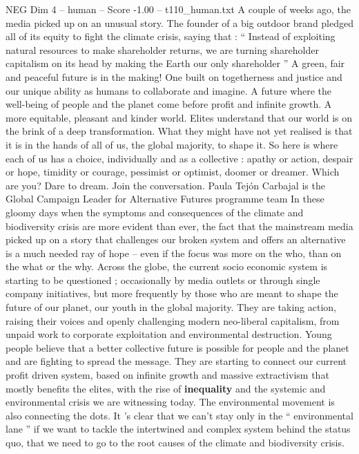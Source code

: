 \begin{textsample}{NEG Dim 4 – human – Score -1.00 – t110\_human.txt}  \label{ex:f4_neg_042}
A couple of weeks ago, the media picked up on an unusual story.
The founder of a big outdoor brand pledged all of its equity to fight the climate crisis, saying that : “ Instead of exploiting natural resources to make shareholder returns, we are turning shareholder capitalism on its head by making the Earth our only shareholder ” A green, fair and peaceful future is in the making!
One built on togetherness and justice and our unique ability as humans to collaborate and imagine.
A future where the well-being of people and the planet come before profit and infinite growth.
A more equitable, pleasant and kinder world.
Elites understand that our world is on the brink of a deep transformation.
What they might have not yet realised is that it is in the hands of all of us, the global majority, to shape it.
So here is where each of us has a choice, individually and as a collective : apathy or action, despair or hope, timidity or courage, pessimist or optimist, doomer or dreamer.
Which are you?
Dare to dream.
Join the conversation.
Paula Tejón Carbajal is the Global Campaign Leader for Alternative Futures programme team In these gloomy days when the symptoms and consequences of the climate and biodiversity crisis are more evident than ever, the fact that the mainstream media picked up on a story that challenges our broken system and offers an alternative is a much needed ray of hope – even if the focus was more on the who, than on the what or the why.
Across the globe, the current socio economic system is starting to be questioned ; occasionally by media outlets or through single company initiatives, but more frequently by those who are meant to shape the future of our planet, our youth in the global majority.
They are taking action, raising their voices and openly challenging modern neo-liberal capitalism, from unpaid work to corporate exploitation and environmental destruction.
Young people believe that a better collective future is possible for people and the planet and are fighting to spread the message.
They are starting to connect our current profit driven system, based on infinite growth and massive extractivism that mostly benefits the elites, with the rise of \textbf{inequality} and the systemic and environmental crisis we are witnessing today.
The environmental movement is also connecting the dots.
It ’s clear that we can't stay only in the “ environmental lane ” if we want to tackle the intertwined and complex system behind the status quo, that we need to go to the root causes of the climate and biodiversity crisis.

\end{textsample}
